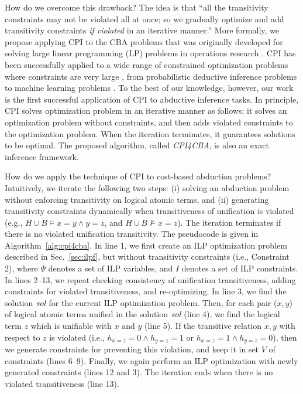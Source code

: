 \documentclass[english]{jnlp_1.4}
\begin{document}
How do we overcome this drawback? The idea is that ``all the
transitivity constraints may not be violated all at once; so we
gradually optimize and add transitivity constraints \emph{if violated}
in an iterative manner.'' More formally, we propose applying
CPI to the CBA problems that was originally developed
for solving large linear programming (LP) problems in operations
research \cite{Dantzig54}.  CPI has been successfully applied to a
wide range of constrained optimization problems where constraints are
very large \cite{Riedel06,Riedel08,Joachims09,Berant11}, from
probabilistic deductive inference problems \cite{Riedel08} to machine
learning problems \cite{Joachims09}. To the best of our knowledge,
however, our work is the first successful application of CPI to
abductive inference tasks. In principle, CPI solves optimization
problem in an iterative manner as follows: it solves an optimization
problem without constraints, and then adds violated constraints to the
optimization problem. When the iteration terminates, it guarantees
solutions to be optimal. The proposed algorithm, called
\emph{CPI4CBA}, is also an exact inference framework.

How do we apply the technique of CPI to cost-based abduction problems?
Intuitively, we iterate the following two steps: (i) solving an
abduction problem without enforcing transitivity on logical atomic
terms, and (ii) generating transitivity constraints dynamically when
transitiveness of unification is violated (e.g., $H \cup B \models x=y
\land y=z$, and $H \cup B \not\models x = z$). The iteration
terminates if there is no violated unification transitivity. The
pseudocode is given in Algorithm~\ref{alg:cpi4cba}. In line 1, we
first create an ILP optimization problem described in
Sec.~\ref{sec:ilpf}, but
without transitivity constraints (i.e., Constraint 2), where $\Psi$
denotes a set of ILP variables, and $I$ denotes a set of ILP
constraints. In lines 2--13, we repeat checking consistency of
unification transitiveness, adding constraints for violated
transitiveness, and re-optimizing. In line 3, we find the solution
$\emph{sol}$ for the current ILP optimization problem. Then, for each
pair ($x,y$) of logical atomic terms unified in the solution
$\emph{sol}$ (line 4), we find the logical term $z$ which is unifiable
with $x$ and $y$ (line 5). If the transitive relation $x, y$ with
respect to $z$ is violated (i.e., $h_{x=z}=0 \land h_{y=z}=1$ or
$h_{x=z}=1 \land h_{y=z}=0$), then we generate constraints for
preventing this violation, and keep it in set $V$ of constraints (lines
6--9). Finally, we again perform an ILP optimization with newly
generated constraints (lines 12 and 3). The iteration ends when there
is no violated transitiveness (line 13).
\end{document}
